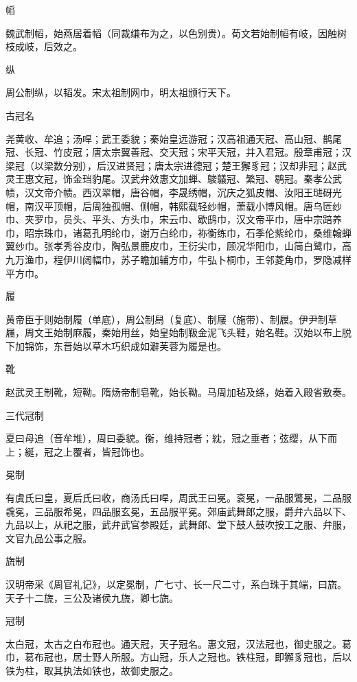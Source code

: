 \documentclass[a4paper,12pt,UTF8,twoside]{ctexbook}
\begin{document}
    幍
    
    魏武制幍，始燕居着幍（同裁缣布为之，以色别贵）。荀文若始制幍有岐，因触树枝成岐，后效之。
    
    纵
    
    周公制纵，以韬发。宋太祖制网巾，明太祖颁行天下。
    
    古冠名
    
    尧黄收、牟追；汤哻；武王委貌；秦始皇远游冠；汉高祖通天冠、高山冠、鹊尾冠、长冠、竹皮冠；唐太宗翼善冠、交天冠；宋平天冠，并入君冠。殷章甫冠；汉梁冠（以梁数分别），后汉进贤冠；唐太宗进德冠；楚王獬豸冠；汉却非冠；赵武灵王惠文冠，饰金珰豹尾。汉武弁效惠文加蝉、鵔鸃冠、繁冠、鹖冠。秦孝公武帻，汉文帝介帻。西汉翠帽，唐谷帽，李晟绣帽，沉庆之狐皮帽、汝阳王琎砑光帽，南汉平顶帽，后周独孤帽、侧帽，韩熙载轻纱帽，萧载小博风帽。唐乌匼纱巾、夹罗巾，员头、平头、方头巾，宋云巾、歇鸱巾，汉文帝平巾，唐中宗踣养巾，昭宗珠巾，诸葛孔明纶巾，谢万白纶巾，祢衡练巾，石季伦紫纶巾，桑维翰蝉翼纱巾。张孝秀谷皮巾，陶弘景鹿皮巾，王衍尖巾，顾况华阳巾，山简白鹭巾，高九万渔巾，程伊川阔幅巾，苏子瞻加辅方巾，牛弘卜桐巾，王邻菱角巾，罗隐减样平方巾。
    
    履
    
    黄帝臣于则始制履（单底），周公制舄（复底）、制屦（施带）、制屧。伊尹制草屩，周文王始制麻履，秦始用丝，始皇始制靸金泥飞头鞋，始名鞋。汉始以布上脱下加锦饰，东晋始以草木巧织成如澼芙蓉为履是也。
    
    靴
    
    赵武灵王制靴，短靿。隋炀帝制皂靴，始长靿。马周加毡及绦，始着入殿省敷奏。
    
    三代冠制
    
    夏曰母追（音牟堆），周曰委貌。衡，维持冠者；紞，冠之垂者；弦缨，从下而上；綖，冠之上覆者，皆冠饰也。
    
    冕制
    
    有虞氏曰皇，夏后氏曰收，商汤氏曰哻，周武王曰冕。衮冕，一品服鷩冕，二品服毳冕，三品服希冕，四品服玄冕，五品服平冕。郊庙武舞郎之服，爵弁六品以下、九品以上，从祀之服，武弁武官参殿廷，武舞郎、堂下鼓人鼓吹按工之服、弁服，文官九品公事之服。
    
    旒制
    
    汉明帝采《周官礼记》，以定冕制，广七寸、长一尺二寸，系白珠于其端，曰旒。天子十二旒，三公及诸侯九旒，卿七旒。
    
    冠制
    
    太白冠，太古之白布冠也。通天冠，天子冠名。惠文冠，汉法冠也，御史服之。葛巾，葛布冠也，居士野人所服。方山冠，乐人之冠也。铁柱冠，即獬豸冠也，后以铁为柱，取其执法如铁也，故御史服之。
    
\end{document}
